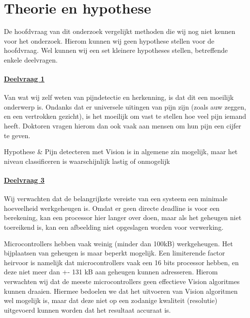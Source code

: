 \documentclass[11pt]{article}
\begin{document}
    \section{Theorie en hypothese}\label{sec:theorie-en-hypothese}
    De hoofdvraag van dit onderzoek vergelijkt methoden die wij nog niet kennen voor het onderzoek.
    Hierom kunnen wij geen hypothese stellen voor de hoofdvraag.
    Wel kunnen wij een set kleinere hypotheses stellen, betreffende enkele deelvragen.

    \paragraph{\hyperref[itm:dv1]{Deelvraag 1}}
    Van wat wij zelf weten van pijndetectie en herkenning, is dat dit een moeilijk onderwerp is.
    Ondanks dat er universele uitingen van pijn zijn (zoals auw zeggen, en een vertrokken gezicht), is het moeilijk om vast te stellen hoe veel pijn iemand heeft.
    Doktoren vragen hierom dan ook vaak aan mensen om hun pijn een cijfer te geven.\\


    \begin{definition}
        Hypothese & Pijn detecteren met Vision is in algemene zin mogelijk, maar het niveau classificeren is waarschijnlijk lastig of onmogelijk
    \end{definition}


    \paragraph{\hyperref[itm:dv3]{Deelvraag 3}}
    Wij verwachten dat de belangrijkste vereiste van een systeem een minimale hoeveelheid werkgeheugen is.
    Omdat er geen directe deadline is voor een berekening, kan een processor hier langer over doen, maar als het geheugen niet toereikend is, kan een afbeelding niet opgeslagen worden voor verwerking.

    Microcontrollers hebben vaak weinig (minder dan 100kB) werkgeheugen.
    Het bijplaatsen van geheugen is maar beperkt mogelijk.
    Een limiterende factor heirvoor is namelijk dat microcontrollers vaak een 16 bits processor hebben, en deze niet meer dan +- 131 kB aan geheugen kunnen adresseren.
    Hierom verwachten wij dat de meeste microcontrollers geen effectieve Vision algoritmes kunnen draaien.
    Hiermee bedoelen we dat het uitvoeren van Vision algoritmen wel mogelijk is, maar dat deze niet op een zodanige kwaliteit (resolutie) uitgevoerd kunnen worden dat het resultaat accuraat is.
\end{document}
